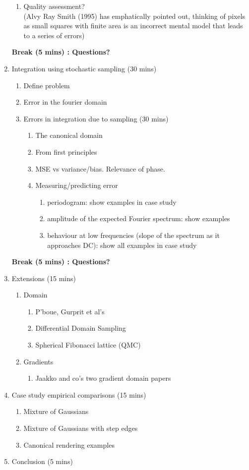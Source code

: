 \begin{enumerate}
\begin{enumerate}
		\item Quality assessment? \\
		(Alvy Ray Smith (1995) has emphatically pointed out, thinking of pixels as small squares with 
		finite area is an incorrect mental model that leads to a series of errors)  
	\end{enumerate}
	\textbf{Break (5 mins) : Questions?}
	\item Integration using stochastic sampling (30 mins) 
	\begin{enumerate}
	\itemsep-0.4em
		\item Define problem
		\item Error in the fourier domain
		\item Errors in integration due to sampling (30 mins)
		\begin{enumerate}
		\itemsep-0.6em
			\item The canonical domain
			\item From first principles
			\item MSE vs variance/bias. Relevance of phase.
			\item Measuring/predicting error
			\begin{enumerate}
			\itemsep-0.6em
				\item periodogram: show examples in case study
				\item amplitude of the expected Fourier spectrum: show examples 
				\item behaviour at low frequencies (slope of the spectrum as it approaches DC): show 
				all examples in case study
			\end{enumerate}
		\end{enumerate}
	\end{enumerate}
	\textbf{Break (5 mins) : Questions?} 
	\item Extensions (15 mins)
	\begin{enumerate}
	\itemsep-0.4em
		\item Domain 
		\begin{enumerate} 
		\itemsep-0.6em
			\item P’boue, Gurprit et al’s
			\item Differential Domain Sampling
			\item Spherical Fibonacci lattice (QMC)
		\end{enumerate}
		\item Gradients
		\begin{enumerate}
			\item Jaakko and co’s two gradient domain papers
		\end{enumerate}
	\end{enumerate}
	\item Case study empirical comparisons (15 mins) 	
	\begin{enumerate}
	\itemsep-0.4em
		\item Mixture of Gaussians
		\item Mixture of Gaussians with step edges
		\item Canonical rendering examples
	\end{enumerate}
	\item Conclusion (5 mins)
\end{enumerate}






